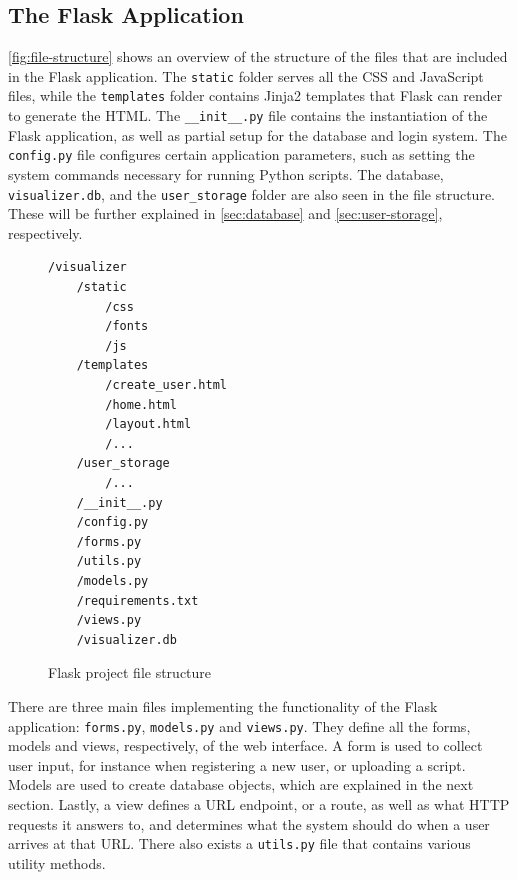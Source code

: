 \subsection{The Flask Application}

\autoref{fig:file-structure} shows an overview of the structure of the files that are included in the Flask application. The \texttt{static} folder serves all the CSS and JavaScript files, while the \texttt{templates} folder contains Jinja2 templates that Flask can render to generate the HTML. The \texttt{\_\_init\_\_.py} file contains the instantiation of the Flask application, as well as partial setup for the database and login system. The \texttt{config.py} file configures certain application parameters, such as setting the system commands necessary for running Python scripts. The database, \texttt{visualizer.db}, and the \texttt{user\_storage} folder are also seen in the file structure. These will be further explained in \autoref{sec:database} and \autoref{sec:user-storage}, respectively.\\

\begin{figure}[h!]
\begin{verbatim}
/visualizer
    /static
        /css
        /fonts
        /js
    /templates
        /create_user.html
        /home.html
        /layout.html
        /...
    /user_storage
        /...
    /__init__.py
    /config.py
    /forms.py
    /utils.py
    /models.py
    /requirements.txt
    /views.py
    /visualizer.db
\end{verbatim}
\caption{Flask project file structure}
\label{fig:file-structure}
\end{figure}

\noindent There are three main files implementing the functionality of the Flask application: \texttt{forms.py}, \texttt{models.py} and \texttt{views.py}. They define all the forms, models and views, respectively, of the web interface. A form is used to collect user input, for instance when registering a new user, or uploading a script. Models are used to create database objects, which are explained in the next section. Lastly, a view defines a URL endpoint, or a route, as well as what HTTP requests it answers to, and determines what the system should do when a user arrives at that URL. There also exists a \texttt{utils.py} file that contains various utility methods. \\

